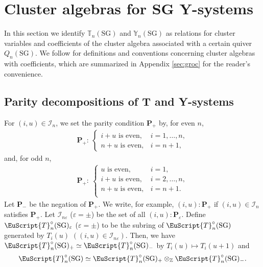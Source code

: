 \documentclass[pdftex]{sigma}
\numberwithin{equation}{section}
\theoremstyle{definition}
\begin{document}
\section{Cluster algebras for SG Y-systems}
\label{sec:clusterSG}

In this section we identify $\mathbb{T}_{n}(\mathrm{SG})$ and
$\mathbb{Y}_{n}(\mathrm{SG})$ as relations for cluster variables
and coef\/f\/icients of the cluster algebra
associated with a certain quiver $Q_{n}(\mathrm{SG})$.
We follow \cite{Fomin07}
 for def\/initions and conventions concerning cluster algebras
with coef\/f\/icients,
which are summarized in Appendix \ref{sec:groc} for the reader's
convenience.

\subsection{Parity decompositions of T and Y-systems}


For $(i,u)\in \mathcal{I}_{n}$,
we set the parity condition $\mathbf{P}_{+}$ by,
for even $n$,
\begin{gather*}
\mathbf{P}_{+}: \
\begin{cases}
\mbox{$i+u$ is even},& i=1,\dots,n,\\
\mbox{$n+u$ is even}, & i=n+1,
\end{cases}
\end{gather*}
and, for odd $n$,
\begin{gather*}
\mathbf{P}_{+}: \
\begin{cases}
\mbox{$u$ is even}, & i=1,\\
\mbox{$i+u$ is even}, & i=2,\dots,n, \\
\mbox{$n+u$ is even}, & i=n+1.\\
\end{cases}
\end{gather*}
Let $\mathbf{P}_-$ be the negation of $\mathbf{P}_+$.
We write, for example, $(i,u):\mathbf{P}_{+}$ if $(i,u)\in
\mathcal{I}_n$ satisf\/ies
$\mathbf{P}_{+}$.
Let $\mathcal{I}_{n\varepsilon}$ ($\varepsilon=\pm$)
be the set of all $(i,u):\mathbf{P}_{\varepsilon}$.
Def\/ine $\EuScript{T}^{\circ}_{n}(\mathrm{SG})_{\varepsilon}$
($\varepsilon=\pm$)
to be the subring of $\EuScript{T}^{\circ}_{n}(\mathrm{SG})$
generated by
 $T_i(u)$
$((i,u)\in \mathcal{I}_{n\varepsilon})$.
Then, we have
$\EuScript{T}^{\circ}_{n}(\mathrm{SG})_+
\simeq
\EuScript{T}^{\circ}_{n}(\mathrm{SG})_-
$
by $T_i(u)\mapsto T_i(u+1)$ and
\begin{gather*}
\EuScript{T}^{\circ}_{n}(\mathrm{SG})
\simeq
\EuScript{T}^{\circ}_{n}(\mathrm{SG})_+
\otimes_{\mathbb{Z}}
\EuScript{T}^{\circ}_{n}(\mathrm{SG})_-.
\end{gather*}
\end{document}
